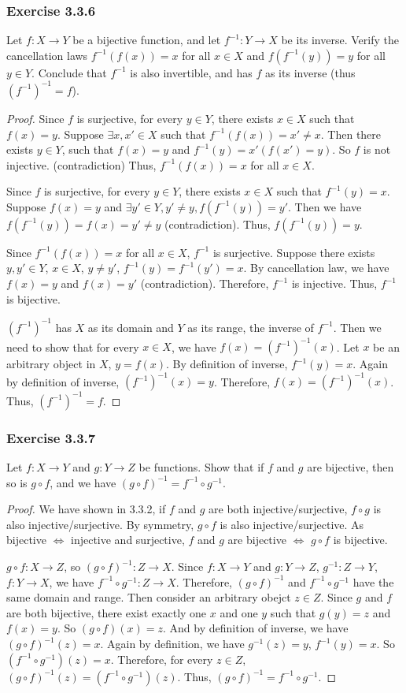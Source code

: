 \documentclass[12pt, letter]{article}
\begin{document}
\subsubsection*{Exercise 3.3.6}
Let $f:X\to Y$ be a bijective function, and let $f^{-1}:Y\to X$ be its inverse. Verify the cancellation laws $f^{-1}(f(x))=x$ for all $x\in X$ and $f(f^{-1}(y))=y$ for all $y\in Y$. Conclude that $f^{-1}$ is also invertible, and has $f$ as its inverse (thus $(f^{-1})^{-1}=f$).
\begin{proof}
    Since $f$ is surjective, for every $y\in Y$, there exists $x\in X$ such that $f(x)=y$. Suppose $\exists x,x'\in X$ such that $f^{-1}(f(x))=x'\ne x$. Then there exists $y\in Y$, such that $f(x)=y$ and $f^{-1}(y)=x' (f(x')=y)$. So $f$ is not injective. (contradiction) Thus, $f^{-1}(f(x))=x$ for all $x\in X$.
    
    Since $f$ is surjective, for every $y\in Y$, there exists $x\in X$ such that $f^{-1}(y)=x$. Suppose $f(x)=y$ and $\exists y'\in Y,y'\ne y, f(f^{-1}(y))=y'$. Then we have $f(f^{-1}(y))=f(x)=y'\ne y$ (contradiction). Thus, $f(f^{-1}(y))=y$. 

    Since $f^{-1}(f(x))=x$ for all $x\in X$, $f^{-1}$ is surjective. Suppose there exists $y,y'\in Y$, $x\in X$, $y\ne y'$, $f^{-1}(y)=f^{-1}(y')=x$. By cancellation law, we have $f(x)=y$ and $f(x)=y'$ (contradiction). Therefore, $f^{-1}$ is injective. 
    Thus, $f^{-1}$ is bijective. 

    $(f^{-1})^{-1}$ has $X$ as its domain and $Y$ as its range, the inverse of $f^{-1}$. Then we need to show that for every $x\in X$, we have $f(x)=(f^{-1})^{-1}(x)$. Let $x$ be an arbitrary object in $X$, $y=f(x)$. By definition of inverse, $f^{-1}(y)=x$. 
    Again by definition of inverse, $(f^{-1})^{-1}(x)=y$. Therefore, $f(x)=(f^{-1})^{-1}(x)$. Thus, $(f^{-1})^{-1}=f$.
\end{proof}
\subsubsection*{Exercise 3.3.7}
Let $f:X\to Y$ and $g:Y\to Z$ be functions. Show that if $f$ and $g$ are bijective, then so is $g\circ f$, and we have $(g\circ f)^{-1}=f^{-1}\circ g^{-1}$.
\begin{proof}
    We have shown in 3.3.2, if $f$ and $g$ are both injective/surjective, $f\circ g$ is also injective/surjective. By symmetry, $g\circ f$ is also injective/surjective. As bijective $\iff$ injective and surjective, $f$ and $g$ are bijective $\iff$ $g\circ f$ is bijective. 

    $g\circ f:X\to Z$, so $(g\circ f)^{-1}:Z\to X$. Since $f:X\to Y$ and $g:Y\to Z$, $g^{-1}:Z\to Y$, $f:Y\to X$, we have $f^{-1}\circ g^{-1}:Z\to X$. Therefore, $(g\circ f)^{-1}$ and $f^{-1}\circ g^{-1}$ have the same domain and range. Then consider an arbitrary obejct $z\in Z$. Since $g$ and $f$ are both bijective, there exist exactly one $x$ and one $y$ such that 
    $g(y)=z$ and $f(x)=y$. So $(g\circ f)(x)=z$. And by definition of inverse, we have $(g\circ f)^{-1}(z)=x$. Again by definition, we have $g^{-1}(z)=y$, $f^{-1}(y)=x$. So $(f^{-1}\circ g^{-1})(z)=x$. Therefore, for every $z\in Z$, $(g\circ f)^{-1}(z)=(f^{-1}\circ g^{-1})(z)$. Thus, $(g\circ f)^{-1}=f^{-1}\circ g^{-1}$.
\end{proof}
\end{document}
